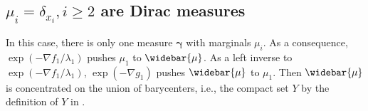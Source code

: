 \subsection{\texorpdfstring{$\mu_i = \delta_{x_i}, i \geq 2$}{µ\_i = δ\_\{x\_i\}, i ≥ 2} are Dirac measures}
\label{section:dirac_measures}
In this case, there is only one measure $\boldsymbol{\gamma}$ with marginals $\mu_i$.
As a consequence, $\exp(-\nabla f_1 / \lambda_1)$ pushes $\mu_1$ to $\widebar{\mu}$.
As a left inverse to $\exp(-\nabla f_1/\lambda_1)$,
\(\exp(-\nabla g_1)\) pushes $\widebar{\mu}$ to $\mu_1$.
Then $\widebar{\mu}$ is concentrated on the union of barycenters,
i.e., the compact set $Y$ by the definition of $Y$ in .
